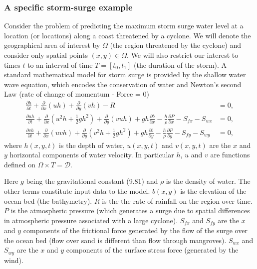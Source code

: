 

\subsubsection*{A specific storm-surge example}
Consider the problem of predicting the maximum 
storm surge water level at a location (or locations) along a coast threatened by a cyclone. We will denote the geographical area of interest by $\Omega$ 
(the region threatened by the cyclone) and consider only 
spatial points $(x,y) \in \Omega$. We will also restrict our interest to times $t$ to an interval of time $T = [t_0, t_1]$ (the duration of the storm). 
A standard mathematical model for storm surge is provided 
by the shallow water wave equation,  which encodes the conservation of water and Newton's second Law (rate of change of momentum - Force = 0) 
\begin{subequations}
 \label{eqn:storm} 
\begin{align}
\frac{\partial h}{\partial t} +
\frac{\partial }{\partial x} \left(uh\right) + \frac{\partial }{\partial y} \left(vh\right) -R & =  0 ,\\
\frac{\partial uh}{\partial t} +
\frac{\partial }{\partial x} \left(u^2h +  \frac12 gh^2 \right) 
+ \frac{\partial }{\partial y} \left(vuh\right) + gh \frac{\partial b}{\partial x} 
- \frac{h}{\rho} \frac{\partial P}{\partial  x} - S_{fx} - S_{wx}  &= 0 ,   \\
\frac{\partial vh}{\partial t} +
\frac{\partial }{\partial x} \left(uvh  \right) 
+ \frac{\partial }{\partial y} \left(v^2h + \frac12 g h^2 \right) + gh \frac{\partial b}{\partial y} 
- \frac{h}{\rho} \frac{\partial P}{\partial  y} - S_{fy} -  S_{wy}& = 0,  
\end{align}
\end{subequations}
where $h(x,y,t)$ is the depth of water, $u(x,y,t)$ and $v(x,y,t)$ are the $x$ and $y$ horizontal components of water velocity. In particular $h$, $u$ and $v$ are functions defined on $\Omega \times T = \mathcal{D}$. 

Here $g$ being the gravitational constant (9.81) and $\rho$ is the density of water. 
The other terms constitute input data to the model. 
 $b(x,y)$ is the  elevation of the ocean bed (the bathymetry).
$R$ is the the rate of rainfall on the region over time.
$P$ is the atmospheric pressure (which generates a surge due to spatial differences in atmospheric pressure associated with a large cyclone).
$S_{fx}$ and $S_{fy}$ are the $x$ and $y$ components of the frictional force generated by the flow of the surge over the ocean bed (flow over sand is different than flow through mangroves).
$S_{wx}$ and $S_{wy}$ are the $x$ and $y$ components of the surface stress force (generated by the wind). 

